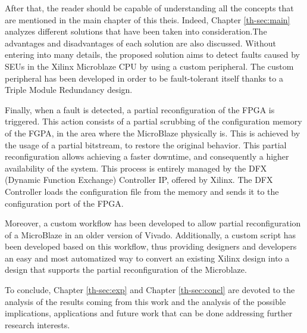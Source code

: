 After that, the reader should be capable of understanding all the concepts that are mentioned in the main chapter of this theis. Indeed, Chapter \ref{th-sec:main} analyzes different solutions that have been taken into consideration.The advantages and disadvantages of each solution are also discussed. Without entering into many details, the proposed solution aims to detect faults caused by SEUs in the Xilinx Microblaze CPU by using a custom peripheral. The custom peripheral has been developed in order to be fault-tolerant itself thanks to a Triple Module Redundancy design.\bigskip

Finally, when a fault is detected, a partial reconfiguration of the FPGA is triggered. This action consists of a partial scrubbing of the configuration memory of the FGPA, in the area where the MicroBlaze physically is. This is achieved by the usage of a partial bitstream, to restore the original behavior. This partial reconfiguration allows achieving a faster downtime, and consequently a higher availability of the system. This process is entirely managed by the DFX (Dynamic Function Exchange) Controller IP, offered by Xilinx. The DFX Controller loads the configuration file from the memory and sends it to the configuration port of the FPGA. \bigskip

Moreover, a custom workflow has been developed to allow partial reconfiguration of a MicroBlaze in an older version of Vivado. Additionally, a custom script has been developed based on this workflow, thus providing designers and developers an easy and most automatized way to convert an existing Xilinx design into a design that supports the partial reconfiguration of the Microblaze.\bigskip

To conclude, Chapter \ref{th-sec:exp} and Chapter \ref{th-sec:concl} are devoted to the analysis of the results coming from this work and the analysis of the possible implications, applications and future work that can be done addressing further research interests.

